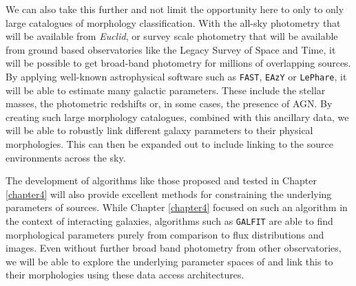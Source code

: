 We can also take this further and not limit the opportunity here to only to only large catalogues of morphology classification. With the all-sky photometry that will be available from \emph{Euclid}, or survey scale photometry that will be available from ground based observatories like the Legacy Survey of Space and Time\DIFdelbegin {}\DIFdelend , it will be possible to get broad-band photometry for millions of overlapping sources. By applying well-known astrophysical software such as \texttt{FAST}, \texttt{EAzY} or \texttt{LePhare}, it will be able to estimate many galactic parameters. These include the stellar masses, the photometric redshifts or, in some cases, the presence of AGN. By creating such large morphology catalogues, combined with this ancillary data, we will be able to robustly link different galaxy parameters to their physical morphologies. This can then be expanded out to include linking to the source environments across the sky. 

The development of algorithms like those proposed and tested in Chapter \ref{chapter4} will also provide excellent methods for constraining the underlying parameters of sources. While Chapter \ref{chapter4} focused on such an algorithm in the context of interacting galaxies, algorithms such as \texttt{GALFIT} are able to find morphological parameters purely from comparison to flux distributions and images. Even without further broad band photometry from other observatories, we will be able to explore the underlying parameter spaces of \DIFdelbegin {}\DIFdelend \DIFaddbegin {}\DIFaddend and link this to their morphologies using these data access architectures. 

